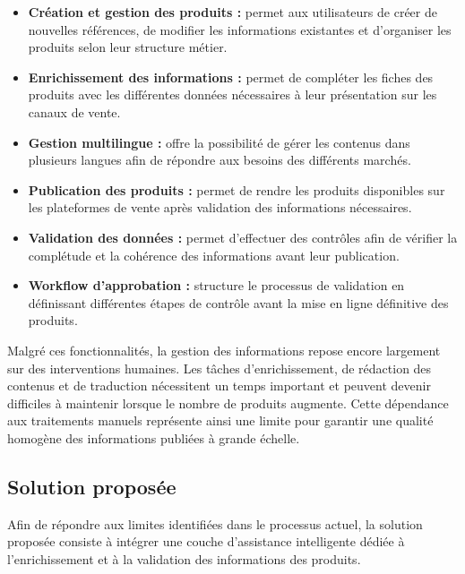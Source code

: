 \begin{itemize}
    \item \textbf{Création et gestion des produits :} permet aux utilisateurs de créer de nouvelles références, de modifier les informations existantes et d'organiser les produits selon leur structure métier.

    \item \textbf{Enrichissement des informations :} permet de compléter les fiches des produits avec les différentes données nécessaires à leur présentation sur les canaux de vente.

    \item \textbf{Gestion multilingue :} offre la possibilité de gérer les contenus dans plusieurs langues afin de répondre aux besoins des différents marchés.

    \item \textbf{Publication des produits :} permet de rendre les produits disponibles sur les plateformes de vente après validation des informations nécessaires.

    \item \textbf{Validation des données :} permet d'effectuer des contrôles afin de vérifier la complétude et la cohérence des informations avant leur publication.

    \item \textbf{Workflow d'approbation :} structure le processus de validation en définissant différentes étapes de contrôle avant la mise en ligne définitive des produits.
\end{itemize}

Malgré ces fonctionnalités, la gestion des informations repose encore largement sur des interventions humaines. Les tâches d'enrichissement, de rédaction des contenus et de traduction nécessitent un temps important et peuvent devenir difficiles à maintenir lorsque le nombre de produits augmente. Cette dépendance aux traitements manuels représente ainsi une limite pour garantir une qualité homogène des informations publiées à grande échelle.

\subsection{Solution proposée}

Afin de répondre aux limites identifiées dans le processus actuel, la solution proposée consiste à intégrer une couche d'assistance intelligente dédiée à l'enrichissement et à la validation des informations des produits.


